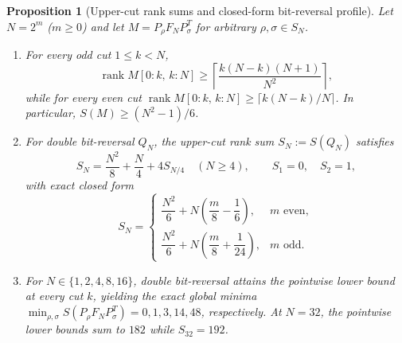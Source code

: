 \documentclass[11pt,reqno]{amsart}
\numberwithin{equation}{section}
\newtheorem{proposition}[theorem]{Proposition}
\theoremstyle{definition}
\theoremstyle{remark}
\newcommand{\rank}{\operatorname{rank}}
\begin{document}
\begin{proposition}[Upper-cut rank sums and closed-form bit-reversal profile]
\label{prop:rank-sums}
Let $N=2^m$ ($m\ge 0$) and let $M = P_\rho F_N P_\sigma^T$ for arbitrary $\rho,\sigma\in S_N$.
\begin{enumerate}[label=(\alph*),leftmargin=2em]
\item For every odd cut $1\le k<N$,
\begin{equation}
\label{eq:odd-cut-lb}
\rank M[0{:}k,\, k{:}N] \ge \left\lceil \frac{k(N-k)(N+1)}{N^2}\right\rceil,
\end{equation}
while for every even cut $\rank M[0{:}k,\, k{:}N]\ge \lceil k(N-k)/N\rceil$. In particular, $S(M)\ge (N^2-1)/6$.
\item For double bit-reversal $Q_N$, the upper-cut rank sum $S_N := S(Q_N)$ satisfies
\begin{equation}
\label{eq:SN-rec}
S_N = \frac{N^2}{8} + \frac{N}{4} + 4S_{N/4}\quad (N\ge 4),\qquad S_1=0,\quad S_2=1,
\end{equation}
with exact closed form
\begin{equation}
\label{eq:SN-closed}
S_N =
\begin{cases}
\dfrac{N^2}{6} + N\left(\dfrac{m}{8} - \dfrac{1}{6}\right), & m\text{ even},\\[8pt]
\dfrac{N^2}{6} + N\left(\dfrac{m}{8} + \dfrac{1}{24}\right), & m\text{ odd}.
\end{cases}
\end{equation}
\item For $N\in\{1,2,4,8,16\}$, double bit-reversal attains the pointwise lower bound at \emph{every} cut $k$, yielding the exact global minima $\min_{\rho,\sigma} S(P_\rho F_N P_\sigma^T) = 0, 1, 3, 14, 48$, respectively. At $N=32$, the pointwise lower bounds sum to $182$ while $S_{32}=192$.
\end{enumerate}
\end{proposition}
\end{document}

